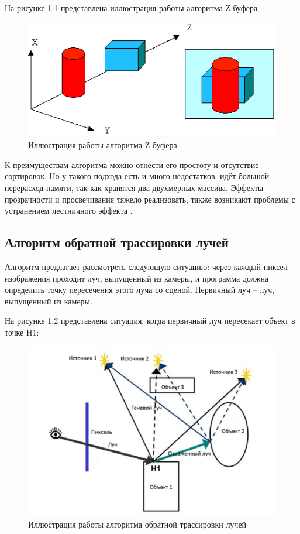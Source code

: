 На рисунке 1.1 представлена иллюстрация работы алгоритма Z-буфера

\FloatBarrier
\begin{figure}[h]
	\begin{center}
		\includegraphics[width=\linewidth]{inc/zbufer.png}
	\end{center}
	\caption{Иллюстрация работы алгоритма Z-буфера}
\end{figure}
\FloatBarrier

К преимуществам алгоритма можно отнести его простоту и отсутствие сортировок.
Но у такого подхода есть и много недостатков: идёт большой перерасход памяти, так как хранятся два двухмерных массива. 
Эффекты прозрачности и просвечивания тяжело реализовать, также возникают проблемы с устранением лестничного эффекта \cite{rojers}.

\subsection{Алгоритм обратной трассировки лучей}
Алгоритм предлагает рассмотреть следующую ситуацию: через каждый пиксел изображения проходит луч, выпущенный из камеры, и программа должна определить точку пересечения этого луча со сценой.
Первичный луч – луч, выпущенный из камеры. 

На рисунке 1.2 представлена ситуация, когда первичный луч пересекает объект в точке H1:
\FloatBarrier
\begin{figure}[h]
	\begin{center}
		\includegraphics[width=\linewidth]{inc/tras.png}
	\end{center}
	\caption{Иллюстрация работы алгоритма обратной трассировки лучей}
\end{figure}
\FloatBarrier

